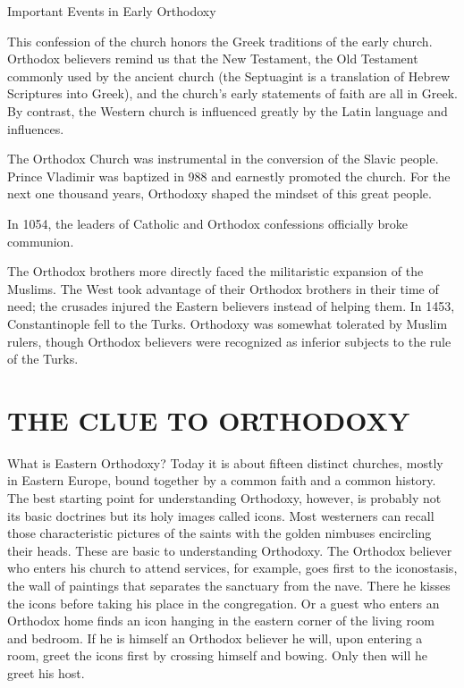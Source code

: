 \begin{sidebar}{Important Events in Early Orthodoxy}
\begin{numlist}
\item[1.] This confession of the church honors the Greek traditions of the early church. Orthodox
  believers remind us that the New Testament, the Old Testament commonly used by the ancient church
  (the Septuagint is a translation of Hebrew Scriptures into Greek), and the church’s early
  statements of faith are all in Greek. By contrast, the Western church is influenced greatly by the
  Latin language and influences.
\item[2.] The Orthodox Church was instrumental in the conversion of the Slavic people. Prince
  Vladimir was baptized in 988 and earnestly promoted the church. For the next one thousand years,
  Orthodoxy shaped the mindset of this great people.
\item[3.] In 1054, the leaders of Catholic and Orthodox confessions officially broke communion.
\item[4.] The Orthodox brothers more directly faced the militaristic expansion of the Muslims. The
  West took advantage of their Orthodox brothers in their time of need; the crusades injured the
  Eastern believers instead of helping them. In 1453, Constantinople fell to the Turks. Orthodoxy
  was somewhat tolerated by Muslim rulers, though Orthodox believers were recognized as inferior
  subjects to the rule of the Turks.
\end{numlist}
\end{sidebar}

\section{THE CLUE TO ORTHODOXY}

What is Eastern Orthodoxy? Today it is about fifteen distinct churches, mostly in Eastern Europe,
bound together by a common faith and a common history. The best starting point for understanding
Orthodoxy, however, is probably not its basic doctrines but its holy images called icons. Most
westerners can recall those characteristic pictures of the saints with the golden nimbuses
encircling their heads. These are basic to understanding Orthodoxy. The Orthodox believer who enters
his church to attend services, for example, goes first to the iconostasis, the wall of paintings
that separates the sanctuary from the nave. There he kisses the icons before taking his place in the
congregation. Or a guest who enters an Orthodox home finds an icon hanging in the eastern corner of
the living room and bedroom. If he is himself an Orthodox believer he will, upon entering a room,
greet the icons first by crossing himself and bowing. Only then will he greet his host.


